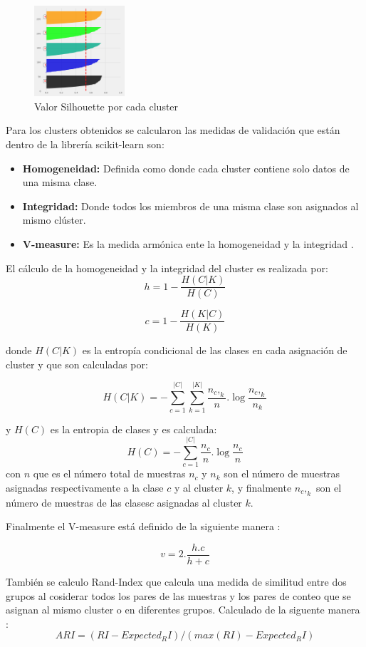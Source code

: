 \begin{figure}[H] 
	\centering
	\includegraphics[width=0.3\textwidth]{Kap4/S}
	\caption{Valor Silhouette por cada cluster} 
	\label{fig:S}
\end{figure}

Para los clusters obtenidos se calcularon las medidas de validación que están dentro de la librería scikit-learn \cite{scikit-learn} son:

\begin{itemize}
	\item  \textbf{Homogeneidad:} Definida como donde cada cluster contiene solo datos de una misma clase.
	\item \textbf{Integridad:} Donde todos los miembros de una misma clase son asignados al mismo clúster.	
	\item \textbf{V-measure:} Es la medida armónica ente la homogeneidad y la integridad \cite{Rosenberg2007}. 		
\end{itemize}

El cálculo de la homogeneidad y la integridad del cluster es realizada por:
$$h=1- \frac{H(C|K)}{H(C)} $$

$$c=1- \frac{H(K|C)}{H(K)}$$

donde $H(C|K)$ es la entropía condicional de las clases en cada asignación de cluster y que son calculadas por:

$$H(C|K)= - \sum_{c=1}^{|C|} \sum_{k=1}^{|K|} \frac{n_c,_k}{n} . \log \frac{n_c,_k}{n_k}$$ 

y $H(C)$ es la entropia de clases y es calculada:
$$H(C)=  - \sum_{c=1}^{|C|} \frac{n_c}{n} . \log \frac{n_c}{n}$$ 
con $n$ que es el número total de muestras $n_c$ y $n_k$ son el número de muestras asignadas respectivamente a la clase $c$ y al cluster $k$, y finalmente $n_c,_k$ son el número de muestras de las clases$c$ asignadas al cluster $k$.

Finalmente el V-measure está definido de la siguiente manera \cite{Rosenberg2007}:

$$v= 2.\frac{h.c}{h+c}$$

También se calculo Rand-Index que calcula una medida de similitud entre dos grupos al cosiderar todos los pares de las muestras y los pares de conteo que se asignan al mismo cluster o en diferentes grupos. Calculado de la siguente manera \cite{scikit-learn}:
$$ARI = (RI - Expected_RI) / (max(RI) - Expected_RI)$$

